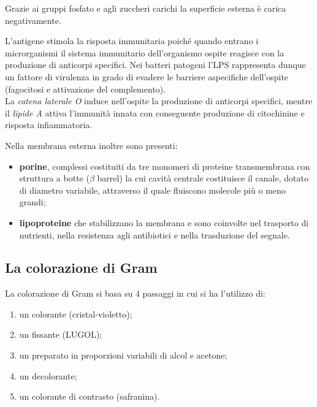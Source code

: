 \documentclass[11pt]{book}
\begin{document}
Grazie ai gruppi fosfato e agli zuccheri carichi la superficie esterna è carica negativamente.

\vspace{1em}
L'antigene stimola la risposta immunitaria poiché quando entrano i microrganismi il sistema immunitario dell'organismo ospite reagisce con la produzione di anticorpi specifici.
Nei batteri patogeni l’LPS rappresenta dunque un fattore di virulenza in grado di evadere le barriere aspecifiche dell’ospite (fagocitosi e attivazione del complemento).\\
La \emph{catena laterale O} induce nell’ospite la produzione di anticorpi specifici, mentre il \emph{lipide A} attiva l’immunità innata con conseguente produzione di citochinine e risposta infiammatoria.

\vspace{1em}
Nella membrana esterna inoltre sono presenti:
\begin{itemize}
\item \textbf{porine}, complessi costituiti da tre monomeri di proteine transmembrana con struttura a botte ($\beta$ barrel) la cui cavità centrale costituisce il canale, dotato di diametro variabile, attraverso il quale fluiscono molecole più o meno grandi;
\item \textbf{lipoproteine} che stabilizzano la membrana e sono coinvolte nel trasporto di nutrienti, nella resistenza agli antibiotici e nella trasduzione del segnale.
\end{itemize}

\subsection{La colorazione di Gram}
La colorazione di Gram si basa su 4 passaggi in cui si ha l’utilizzo di:
\begin{enumerate}
\item un colorante (cristal-violetto);
\item un fissante (LUGOL);
\item un preparato in proporzioni variabili di alcol e acetone;
\item un decolorante; 
\item un colorante di contrasto (safranina).
\end{enumerate}
\end{document}
